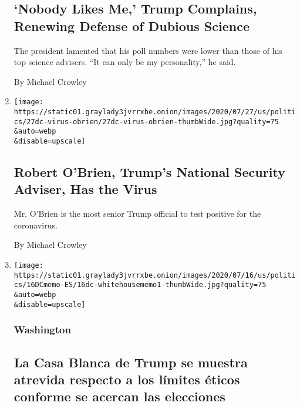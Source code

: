\begin{enumerate}
  \hypertarget{nobody-likes-me-trump-complains-renewing-defense-of-dubious-science}{%
  \subsection{`Nobody Likes Me,' Trump Complains, Renewing Defense of
  Dubious
  Science}\label{nobody-likes-me-trump-complains-renewing-defense-of-dubious-science}}

  The president lamented that his poll numbers were lower than those of
  his top science advisers. ``It can only be my personality,'' he said.

  By Michael Crowley
\item
  \href{/2020/07/27/us/politics/robert-obrien-virus.html}{}

  \texttt{[image: https://static01.graylady3jvrrxbe.onion/images/2020/07/27/us/politics/27dc-virus-obrien/27dc-virus-obrien-thumbWide.jpg?quality=75\\\&auto=webp\\\&disable=upscale]}

  \hypertarget{robert-obrien-trumps-national-security-adviser-has-the-virus}{%
  \subsection{Robert O'Brien, Trump's National Security Adviser, Has the
  Virus}\label{robert-obrien-trumps-national-security-adviser-has-the-virus}}

  Mr. O'Brien is the most senior Trump official to test positive for the
  coronavirus.

  By Michael Crowley
\item
  \href{/es/2020/07/16/espanol/estados-unidos/goya-trump-ivanka.html}{}

  \texttt{[image: https://static01.graylady3jvrrxbe.onion/images/2020/07/16/us/politics/16DCmemo-ES/16dc-whitehousememo1-thumbWide.jpg?quality=75\\\&auto=webp\\\&disable=upscale]}

  \hypertarget{washington}{%
  \subsubsection{Washington}\label{washington}}

  \hypertarget{la-casa-blanca-de-trump-se-muestra-atrevida-respecto-a-los-luxedmites-uxe9ticos-conforme-se-acercan-las-elecciones}{%
  \subsection{La Casa Blanca de Trump se muestra atrevida respecto a los
  límites éticos conforme se acercan las
  elecciones}\label{la-casa-blanca-de-trump-se-muestra-atrevida-respecto-a-los-luxedmites-uxe9ticos-conforme-se-acercan-las-elecciones}}


\end{enumerate}
